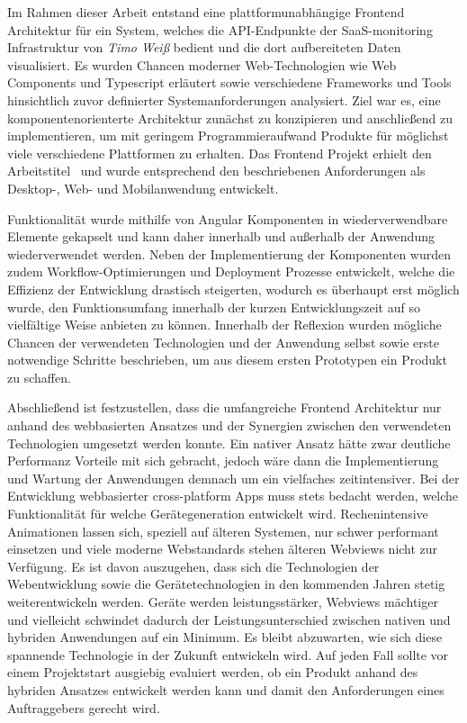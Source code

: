 Im Rahmen dieser Arbeit entstand eine plattformunabhängige Frontend Architektur für ein System,
welches die API-Endpunkte der SaaS-monitoring Infrastruktur von \emph{Timo Weiß} bedient und die dort aufbereiteten Daten visualisiert.
Es wurden Chancen moderner Web-Technologien wie Web Components und Typescript erläutert
sowie verschiedene Frameworks und Tools hinsichtlich zuvor definierter Systemanforderungen analysiert.
Ziel war es, eine komponentenorienterte Architektur zunächst zu konzipieren und anschließend zu implementieren, um
mit geringem Programmieraufwand Produkte für möglichst viele verschiedene Plattformen zu erhalten.
Das Frontend Projekt erhielt den Arbeitstitel \projectname{} und wurde entsprechend den beschriebenen Anforderungen
als Desktop-, Web- und Mobilanwendung entwickelt.

Funktionalität wurde mithilfe von Angular Komponenten in wiederverwendbare
Elemente gekapselt und kann daher innerhalb und außerhalb der Anwendung wiederverwendet werden.
Neben der Implementierung der Komponenten wurden zudem Workflow-Optimierungen und Deployment Prozesse entwickelt,
welche die Effizienz der Entwicklung drastisch steigerten, wodurch es überhaupt erst möglich wurde, den Funktionsumfang
innerhalb der kurzen Entwicklungszeit auf so vielfältige Weise anbieten zu können.
Innerhalb der Reflexion wurden mögliche Chancen der verwendeten Technologien und der Anwendung selbst
sowie erste notwendige Schritte beschrieben, um aus diesem ersten
Prototypen ein Produkt zu schaffen.

Abschließend ist festzustellen, dass die umfangreiche Frontend Architektur nur anhand des webbasierten Ansatzes und der Synergien zwischen den verwendeten Technologien umgesetzt werden konnte.
Ein nativer Ansatz hätte zwar deutliche Performanz Vorteile mit sich gebracht, jedoch wäre dann die Implementierung und Wartung der Anwendungen demnach um ein vielfaches zeitintensiver.
Bei der Entwicklung webbasierter cross-platform Apps muss stets bedacht werden, welche Funktionalität für welche Gerätegeneration entwickelt wird.
Rechenintensive Animationen lassen sich, speziell auf älteren Systemen, nur schwer performant einsetzen und viele moderne Webstandards stehen älteren Webviews nicht zur Verfügung.
Es ist davon auszugehen, dass sich die Technologien der Webentwicklung sowie die Gerätetechnologien in den kommenden Jahren stetig weiterentwickeln werden.
Geräte werden leistungsstärker, Webviews mächtiger und vielleicht schwindet dadurch der Leis­tungs­un­ter­schied zwischen nativen und hybriden Anwendungen auf ein Minimum.
Es bleibt abzuwarten, wie sich diese spannende Technologie in der Zukunft entwickeln wird.
Auf jeden Fall sollte vor einem Projektstart ausgiebig evaluiert werden,
ob ein Produkt anhand des hybriden Ansatzes entwickelt werden kann und damit den Anforderungen eines Auftraggebers gerecht wird.
